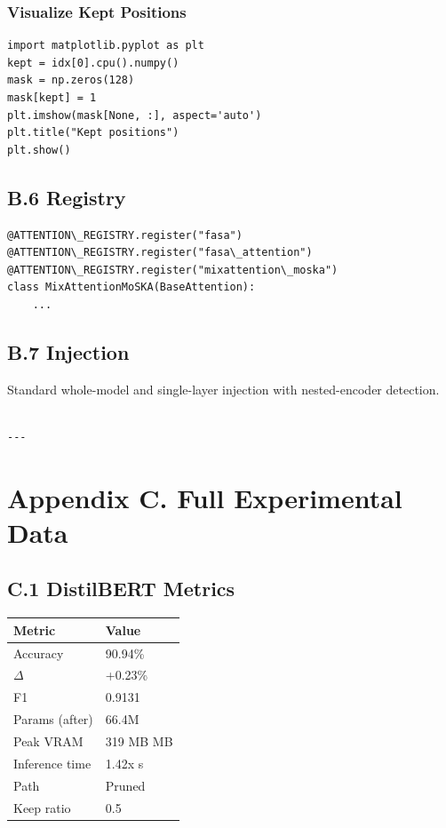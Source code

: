 \subsubsection{Visualize Kept Positions}

\begin{lstlisting}
import matplotlib.pyplot as plt
kept = idx[0].cpu().numpy()
mask = np.zeros(128)
mask[kept] = 1
plt.imshow(mask[None, :], aspect='auto')
plt.title("Kept positions")
plt.show()
\end{lstlisting}

\subsection{B.6 Registry}

\begin{lstlisting}
@ATTENTION\_REGISTRY.register("fasa")
@ATTENTION\_REGISTRY.register("fasa\_attention")
@ATTENTION\_REGISTRY.register("mixattention\_moska")
class MixAttentionMoSKA(BaseAttention):
    ...
\end{lstlisting}

\subsection{B.7 Injection}

Standard whole-model and single-layer injection with nested-encoder 
detection.
\begin{lstlisting}

---
\end{lstlisting}


\section{Appendix C. Full Experimental Data}

\subsection{C.1 DistilBERT Metrics}

\begin{table}[H]
\centering
\small
\begin{tabular}{ll}
\toprule
\textbf{Metric} & \textbf{Value} \\
\midrule
Accuracy & 90.94\% \\
$\Delta$ & +0.23\% \\
F1 & 0.9131 \\
Params (after) & 66.4M \\
Peak VRAM & 319 MB MB \\
Inference time & 1.42x s \\
Path & Pruned \\
Keep ratio & 0.5 \\
\bottomrule
\end{tabular}
\end{table}

